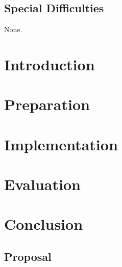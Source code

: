 \documentclass[12pt]{report}
\begin{document}
\section*{Special Difficulties}

None.

\tableofcontents

\chapter{Introduction}



\chapter{Preparation} \label{preparation}



\chapter{Implementation} \label{implementation}



\chapter{Evaluation} \label{evaluation}



\chapter{Conclusion}





{}

\begin{appendices}
\chapter{Proposal} \label{proposal}

\end{appendices}
\end{document}
